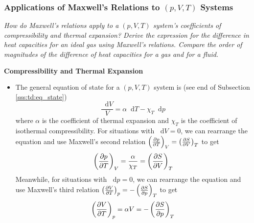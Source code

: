 \documentclass[11pt, a4paper]{article}
\newcommand{\diff}{\mathop{}\!\mathrm{d}} %
\newcommand{\pdveval}[3]{\left(\pdv{#1}{#2}\right)_{#3}}
\begin{document}
\subsubsection{Applications of Maxwell's Relations to $ (p, V, T) $ Systems} \label{sss:applications_max_rel}
\textit{How do Maxwell's relations apply to a $ (p, V, T) $ system's coefficients of compressibility and thermal expansion? Derive the expression for the difference in heat capacities for an ideal gas using Maxwell's relations. Compare the order of magnitudes of the  difference of heat capacities for a gas and for a fluid.}

\vspace{4mm}

\textbf{Compressibility and Thermal Expansion}
\begin{itemize}
	\item The general equation of state for a $ (p, V, T) $ system is  (see end of Subsection \ref{sss:td:eq_state})
	\begin{equation*}
		\frac{\diff V}{V} = \alpha \diff T - \chi_{T} \diff p
	\end{equation*}
	where $ \alpha $ is the coefficient of thermal expansion and $ \chi_{T} $ is the coefficient of isothermal compressibility. For situations with $ \diff V = 0 $, we can rearrange the equation and use Maxwell's second relation $ \pdveval{p}{T}{V} = \pdveval{S}{V}{T}$ to get
	\begin{equation*}
		\pdveval{p}{T}{V} = \frac{\alpha}{\chi_{T}} = \pdveval{S}{V}{T}
	\end{equation*}
	Meanwhile, for situations with $ \diff p = 0$, we can rearrange the equation and use Maxwell's third relation $  \pdveval{V}{T}{p} = -\pdveval{S}{p}{T} $ to get
	\begin{equation*}
		\pdveval{V}{T}{p} = \alpha V = - \pdveval{S}{p}{T}
	\end{equation*}
\end{itemize}
\end{document}
